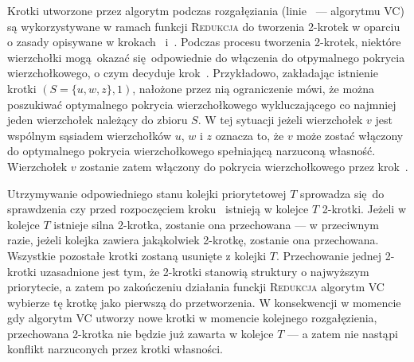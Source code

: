 \par{
  Krotki utworzone przez algorytm podczas rozgałęziania (linie~ ---  algorytmu \textsc{VC}) są wykorzystywane w ramach funkcji \textsc{Redukcja} do tworzenia 2-krotek w oparciu o zasady opisywane w krokach~ i~.
  Podczas procesu tworzenia 2-krotek, niektóre wierzchołki mogą okazać się odpowiednie do włączenia do otpymalnego pokrycia wierzchołkowego, o czym decyduje krok~.
  Przykładowo, zakładając istnienie krotki $(S=\{u, w, z\}, 1)$, nałożone przez nią ograniczenie mówi, że można poszukiwać optymalnego pokrycia wierzchołkowego wykluczającego co najmniej jeden wierzchołek należący do zbioru $S$.
  W tej sytuacji jeżeli wierzchołek $v$ jest wspólnym sąsiadem wierzchołków $u$, $w$ i $z$ oznacza to, że $v$ może zostać włączony do optymalnego pokrycia wierzchołkowego spełniającą narzuconą własność.
  Wierzchołek $v$ zostanie zatem włączony do pokrycia wierzchołkowego przez krok~.

  Utrzymywanie odpowiedniego stanu kolejki priorytetowej $T$ sprowadza się do sprawdzenia czy przed rozpoczęciem kroku~ istnieją w kolejce $T$ 2-krotki.
  Jeżeli w kolejce $T$ istnieje silna 2-krotka, zostanie ona przechowana --- w przeciwnym razie, jeżeli kolejka zawiera jakąkolwiek 2-krotkę, zostanie ona przechowana.
  Wszystkie pozostałe krotki zostaną usunięte z kolejki $T$.
  Przechowanie jednej 2-krotki uzasadnione jest tym, że 2-krotki stanowią struktury o najwyższym priorytecie, a zatem po zakończeniu działania funckji \textsc{Redukcja} algorytm \textsc{VC} wybierze tę krotkę jako pierwszą do przetworzenia.
  W konsekwencji w momencie gdy algorytm \textsc{VC} utworzy nowe krotki w momencie kolejnego rozgałęzienia, przechowana 2-krotka nie będzie już zawarta w kolejce $T$ --- a zatem nie nastąpi konflikt narzuconych przez krotki własności.
}
